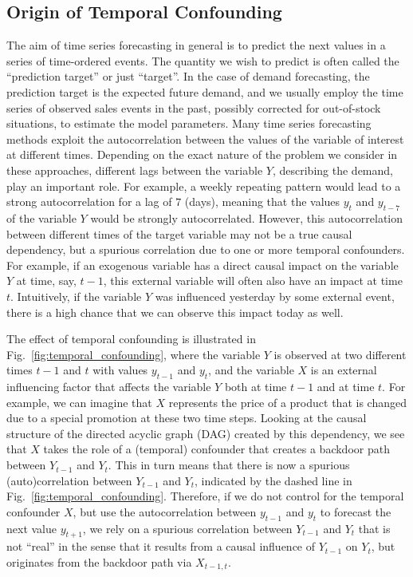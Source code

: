\documentclass[BCOR=1mm, DIV=calc,10pt,
twoside=true,
twocolumn,
headings=normal]{scrartcl}
\newcommand{\fig}{Fig.~}
\begin{document}
\subsection{Origin of Temporal Confounding}
\label{sec:IntroTempConfound}

The aim of time series forecasting in general is to predict the next values in a series of time-ordered events. The quantity we wish to predict is often called the ``prediction target'' or just ``target''. In the case of demand forecasting, the prediction target is the expected future demand, and we usually employ the time series of observed sales events in the past, possibly corrected for out-of-stock situations, to estimate the model parameters. Many time series forecasting methods exploit the autocorrelation between the values of the variable of interest at different times. Depending on the exact nature of the problem we consider in these approaches, different lags between the variable $Y$, describing the demand, play an important role. For example, a weekly repeating pattern would lead to a strong autocorrelation for a lag of $7$ (days), meaning that the values $y_t$ and $y_{t-7}$ of the variable $Y$ would be strongly autocorrelated. However, this autocorrelation between different times of the target variable may not be a true causal dependency, but a spurious correlation due to one or more temporal confounders. For example, if an exogenous variable has a direct causal impact on the variable $Y$ at time, say, $t-1$, this external variable will often also have an impact at time $t$. Intuitively, if the variable $Y$ was influenced yesterday by some external event, there is a high chance that we can observe this impact today as well.

The effect of temporal confounding is illustrated in \fig \ref{fig:temporal_confounding}, where the variable $Y$ is observed at two different times $t-1$ and $t$ with values $y_{t-1}$ and $y_t$, and the variable $X$ is an external influencing factor that affects the variable $Y$ both at time $t-1$ and at time $t$. For example, we can imagine that $X$ represents the price of a product that is changed due to a special promotion at these two time steps. Looking at the causal structure of the directed acyclic graph (DAG) created by this dependency, we see that  $X$ takes the role of a (temporal) confounder that creates a backdoor path between $Y_{t-1}$ and $Y_t$. This in turn means that there is now a spurious (auto)correlation between $Y_{t-1}$ and $Y_t$, indicated by the dashed line in \fig \ref{fig:temporal_confounding}. Therefore, if we do not control for the temporal confounder $X$, but use the autocorrelation between $y_{t-1}$ and $y_t$ to forecast the next value $y_{t+1}$, we rely on a spurious correlation between $Y_{t-1}$ and $Y_t$ that is not ``real'' in the sense that it results from a causal influence of $Y_{t-1}$ on $Y_t$, but originates from the backdoor path via $X_{t-1, t}$.
\end{document}
